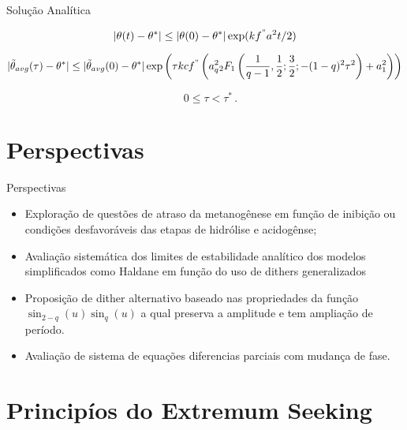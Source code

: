 \documentclass{beamer}
\begin{document}
\begin{frame}{Solução Analítica}

\begin{equation} 
|\theta(t)-\theta^{\ast}| \leq |\theta(0)-\theta^{\ast}| \exp({kf^{"}a^2}t/{2}) \nonumber 
\end{equation}

\begin{equation}
                         		|{\tilde{\theta}_{avg}(\tau)-\theta^{\ast}}| \leq 
	|{\tilde{\theta}_{avg}(0)-\theta^{\ast}}| \exp\left(\tau  kcf^{"}\left(a_q^2 {}_2F_1\left(\frac{1}{q-1},\frac{1}{2};\frac{3}{2}; 
					-(1-q)^2{\tau}^2 \right) + a_1^2 \right)  \right) \nonumber
\end{equation}

	\begin{equation}
			\quad 0 \leq \tau < \tau^{\ast} \,.
     \end{equation}
\end{frame}

\section{Perspectivas}
\begin{frame}{Perspectivas}
	\begin{itemize}
		\item Exploração de questões de atraso da metanogênese em função de inibição ou condições desfavoráveis das etapas de hidrólise e acidogênse;
		\item Avaliação sistemática dos limites de estabilidade analítico dos modelos simplificados como Haldane em função do uso de dithers generalizados 
		\item Proposição de dither alternativo baseado nas propriedades da função $\sin_{2-q}(u) \sin_q(u)$ a qual preserva a amplitude e tem ampliação de período.
		\item Avaliação de sistema de equações diferencias parciais com mudança de fase. 
	\end{itemize}
\end{frame}



\section{Principíos do Extremum Seeking}
\end{document}
